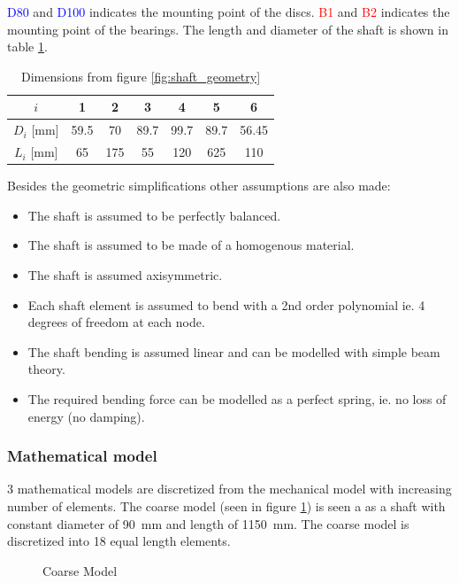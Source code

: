\textcolor{blue}{D80} and \textcolor{blue}{D100} indicates the mounting point of the discs. \textcolor{red}{B1} and \textcolor{red}{B2} indicates the mounting point of the bearings.
The length and diameter of the shaft is shown in table \ref{tab:shaft_geometry}.
\begin{table}[htbp]
    \centering
    \caption{Dimensions from figure \ref{fig:shaft_geometry}}
    \label{tab:shaft_geometry}
    \begin{tabular}{@{}ccccccc@{}}
        \toprule
        $i$  &   1   &   2   &   3   &   4   &   5   &   6   \\ \midrule
        $D_i$ [\si{\milli \meter}]  &   59.5  &   70  &   89.7  &   99.7  &   89.7  &   56.45  \\
        $L_i$ [\si{\milli \meter}]  &   65 &   175    &   55 &   120  &   625  &   110    \\ \bottomrule
    \end{tabular}
\end{table}

Besides the geometric simplifications other assumptions are also made:
\begin{itemize}
    \item The shaft is assumed to be perfectly balanced.
    \item The shaft is assumed to be made of a homogenous material.
    \item The shaft is assumed axisymmetric.
    \item Each shaft element is assumed to bend with a 2nd order polynomial ie. 4 degrees of freedom at each node.
    \item The shaft bending is assumed linear and can be modelled with simple beam theory.
    \item The required bending force can be modelled as a perfect spring, ie. no loss of energy (no damping).
\end{itemize}

\subsubsection{Mathematical model}
3 mathematical models are discretized from the mechanical model with increasing number of elements. The coarse model (seen in figure \ref{fig:coarse_model}) is seen a as a shaft with constant diameter of \SI{90}{\milli \meter} and length of \SI{1150}{\milli \meter}. The coarse model is discretized into 18 equal length elements.
\begin{figure}[htbp]
    \centering
    
    \caption{Coarse Model}
    \label{fig:coarse_model}
\end{figure}

